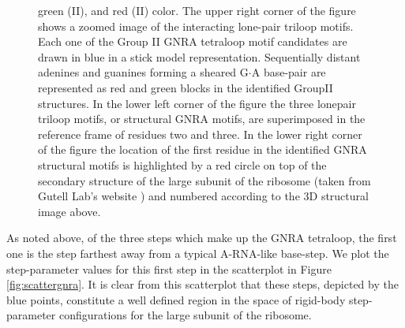 \begin{figure}
{  green  (II), and  red (II)  color.  The  upper right  corner  of the
  figure  shows a zoomed  image of  the interacting  lone-pair triloop
  motifs. Each one of the Group II GNRA tetraloop motif candidates are
  drawn in blue in  a stick model representation. Sequentially distant
  adenines  and guanines  forming  a sheared  G$\cdot$A base-pair  are
  represented  as  red and  green  blocks  in  the identified  GroupII
  structures.   In the  lower  left  corner of  the  figure the  three
  lonepair triloop motifs, or structural GNRA motifs, are superimposed
  in  the reference frame  of residues  two and  three.  In  the lower
  right corner of the figure the  location of the first residue in the
  identified GNRA structural motifs is  highlighted by a red circle on
  top of the secondary structure  of the large subunit of the ribosome
  (taken  from Gutell Lab's  website \cite{cannone2002})  and numbered
  according to the 3D structural image above.}
\label{fig:terts}
\end{figure}

As noted above,  of the three steps which make  up the GNRA tetraloop,
the  first one is  the step  farthest away  from a  typical A-RNA-like
base-step.  We plot  the step-parameter values for this  first step in
the  scatterplot in  Figure \ref{fig:scattergnra}.   It is  clear from
this  scatterplot  that these  steps,  depicted  by  the blue  points,
constitute  a   well  defined  region  in  the   space  of  rigid-body
step-parameter configurations for the large subunit of the ribosome.

